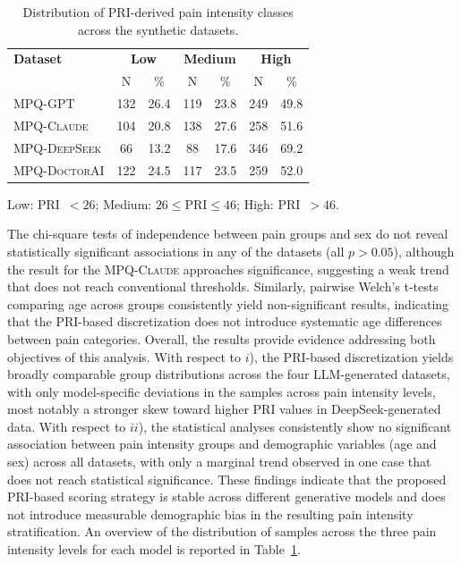\documentclass[preprint,12pt,authoryear]{elsarticle}
\newcommand{\dbGPT}{\small\textsc{MPQ-GPT}\xspace}
\newcommand{\dbClaude}{\small\textsc{MPQ-Claude}\xspace}
\newcommand{\dbDeepSeek}{\small\textsc{MPQ-DeepSeek}\xspace}
\newcommand{\dbDoctorAI}{\small\textsc{MPQ-DoctorAI}\xspace}
\begin{document}
\begin{table}[b!]
\centering
    \renewcommand{\arraystretch}{1} 
    \setlength{\tabcolsep}{10pt}
\begin{tabular}{p{4cm} cccccc}
\toprule
\textbf{Dataset} & \multicolumn{2}{c}{\textbf{Low}} & \multicolumn{2}{c}{\textbf{Medium}} & \multicolumn{2}{c}{\textbf{High}} \\
 & N & \% & N & \% & N & \% \\
\midrule

\dbGPT   & 132 & 26.4 & 119 & 23.8 & 249 & 49.8 \\
\dbClaude  & 104 & 20.8 & 138 & 27.6 & 258 & 51.6 \\
\dbDeepSeek &  66 & 13.2 &  88 & 17.6 & 346 & 69.2 \\
\dbDoctorAI    & 122 & 24.5 & 117 & 23.5 & 259 & 52.0 \\
\bottomrule
\end{tabular}
\vspace{0.2cm}

\scriptsize{Low: PRI~$ < 26$; Medium: $26 \leq \text{PRI} \leq 46$; High: PRI~$ > 46$.}
\caption{Distribution of PRI-derived pain intensity classes across the synthetic datasets.\label{tab:pri_class_distribution}}
\end{table}

The chi-square tests of independence between pain groups and sex do not reveal statistically significant associations in any of the datasets (all $p > 0.05$), although the result for the \dbClaude approaches significance, suggesting a weak trend that does not reach conventional thresholds. Similarly, pairwise Welch’s t-tests comparing age across groups consistently yield non-significant results, indicating that the PRI-based discretization does not introduce systematic age differences between pain categories. Overall, the results provide evidence addressing both objectives of this analysis. With respect to $i$), the PRI-based discretization yields broadly comparable group distributions across the four LLM-generated datasets, with only model-specific deviations in the samples across pain intensity levels, most notably a stronger skew toward higher PRI values in DeepSeek-generated data. With respect to $ii$), the statistical analyses consistently show no significant association between pain intensity groups and demographic variables (age and sex) across all datasets, with only a marginal trend observed in one case that does not reach statistical significance.  These findings indicate that the proposed PRI-based scoring strategy is stable across different generative models and does not introduce measurable demographic bias in the resulting pain intensity stratification. An overview of the distribution of samples across the three pain intensity levels for each model is reported in Table~\ref{tab:pri_class_distribution}. 
\end{document}
